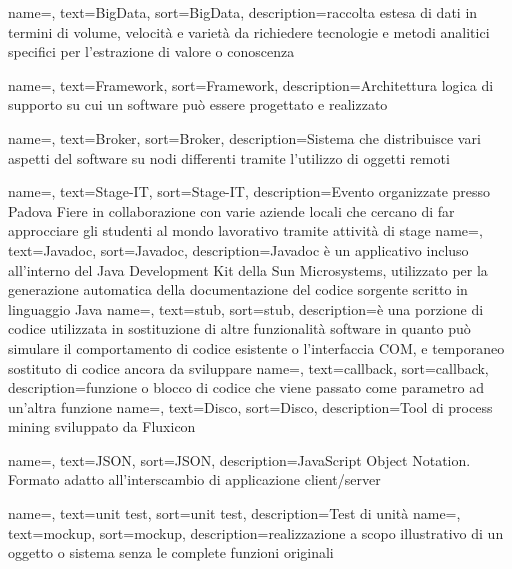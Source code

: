 {
    name=,
    text=BigData,
    sort=BigData,
    description={raccolta estesa di dati in termini di volume, velocità e varietà da richiedere tecnologie e metodi analitici specifici per l'estrazione di valore o conoscenza}
}

{
    name=,
    text=Framework,
    sort=Framework,
    description={Architettura logica di supporto su cui un software può essere progettato e realizzato}
}

{
    name=,
    text=Broker,
    sort=Broker,
    description={Sistema che distribuisce vari aspetti del software su nodi differenti tramite l'utilizzo di oggetti remoti}
}

{
    name=,
    text=Stage-IT,
    sort=Stage-IT,
    description={Evento organizzate presso Padova Fiere in collaborazione con varie aziende locali che cercano di far approcciare gli studenti al mondo lavorativo tramite attività di stage}
}
{
    name=,
    text=Javadoc,
    sort=Javadoc,
    description={Javadoc è un applicativo incluso all'interno del Java Development Kit della Sun Microsystems, utilizzato per la generazione automatica della documentazione del codice sorgente scritto in linguaggio Java}
}
{
    name=,
    text=stub,
    sort=stub,
    description={è una porzione di codice utilizzata in sostituzione di altre funzionalità software in quanto può simulare il comportamento di codice esistente o l'interfaccia COM, e temporaneo sostituto di codice ancora da sviluppare}
}
{
    name=,
    text=callback,
    sort=callback,
    description={funzione o blocco di codice che viene passato come parametro ad un'altra funzione}
}
{
    name=,
    text=Disco,
    sort=Disco,
    description={Tool di process mining sviluppato da Fluxicon}
}

{
    name=,
    text=JSON,
    sort=JSON,
    description={JavaScript Object Notation. Formato adatto all'interscambio di applicazione client/server}
}

{
    name=,
    text=unit test,
    sort=unit test,
    description={Test di unità}
}
{
    name=,
    text=mockup,
    sort=mockup,
    description={realizzazione a scopo illustrativo di un oggetto o sistema senza le complete funzioni originali}
}